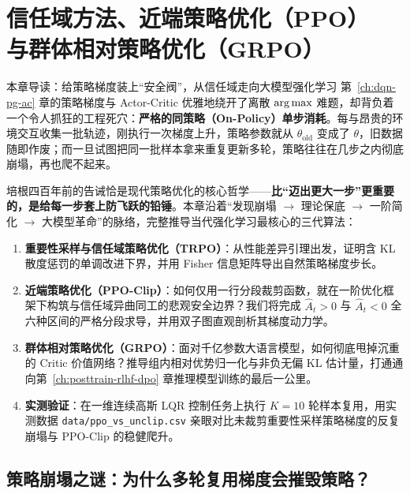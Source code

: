\chapter[信任域、PPO 裁剪与 GRPO 演进]{信任域方法、近端策略优化（PPO）\\与群体相对策略优化（GRPO）}
\label{ch:trpo-ppo-grpo}


\begin{chapIntro}{本章导读：给策略梯度装上“安全阀”，从信任域走向大模型强化学习}
第~\ref{ch:dqn-pg-ac} 章的策略梯度与 Actor-Critic 优雅地绕开了离散 $\operatorname*{arg\,max}$ 难题，却背负着一个令人抓狂的工程死穴：\textbf{严格的同策略（On-Policy）单步消耗}。每与昂贵的环境交互收集一批轨迹，刚执行一次梯度上升，策略参数就从 $\theta_{\mathrm{old}}$ 变成了 $\theta$，旧数据随即作废；而一旦试图把同一批样本拿来重复更新多轮，策略往往在几步之内彻底崩塌，再也爬不起来。

培根四百年前的告诫恰是现代策略优化的核心哲学——\textbf{比“迈出更大一步”更重要的，是给每一步套上防飞跃的铅锤}。本章沿着“发现崩塌 $\to$ 理论保底 $\to$ 一阶简化 $\to$ 大模型革命”的脉络，完整推导当代强化学习最核心的三代算法：
\begin{enumerate}
  \item \textbf{重要性采样与信任域策略优化（TRPO）}：从性能差异引理出发，证明含 KL 散度惩罚的单调改进下界，并用 Fisher 信息矩阵导出自然策略梯度步长。
  \item \textbf{近端策略优化（PPO-Clip）}：如何仅用一行分段裁剪函数，就在一阶优化框架下构筑与信任域异曲同工的悲观安全边界？我们将完成 $\hat{A}_t > 0$ 与 $\hat{A}_t < 0$ 全六种区间的严格分段求导，并用双子图直观剖析其梯度动力学。
  \item \textbf{群体相对策略优化（GRPO）}：面对千亿参数大语言模型，如何彻底甩掉沉重的 Critic 价值网络？推导组内相对优势归一化与非负无偏 KL 估计量，打通通向第~\ref{ch:posttrain-rlhf-dpo} 章推理模型训练的最后一公里。
  \item \textbf{实测验证}：在一维连续高斯 LQR 控制任务上执行 $K=10$ 轮样本复用，用实测数据 \texttt{data/ppo\_vs\_unclip.csv} 亲眼对比未裁剪重要性采样策略梯度的反复崩塌与 PPO-Clip 的稳健爬升。
\end{enumerate}
\end{chapIntro}

\section{策略崩塌之谜：为什么多轮复用梯度会摧毁策略？}
\label{sec:pg-collapse}

